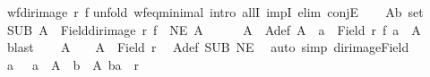 \begin{isabellebody}
\ {\isachardoublequoteopen}wf{\isacharparenleft}{\kern0pt}dir{\isacharunderscore}{\kern0pt}image\ r\ f{\isacharparenright}{\kern0pt}{\isachardoublequoteclose}\isanewline
%
\isadelimproof
%
\endisadelimproof
%
\isatagproof
{}\isamarkupfalse%
{\isacharparenleft}{\kern0pt}unfold\ wf{\isacharunderscore}{\kern0pt}eq{\isacharunderscore}{\kern0pt}minimal{}{\isacharcomma}{\kern0pt}\ intro\ allI\ impI{\isacharcomma}{\kern0pt}\ elim\ conjE{\isacharparenright}{\kern0pt}\isanewline
\ \ \isamarkupfalse%
\ A{\isacharprime}{\kern0pt}{\isacharcolon}{\kern0pt}{\isacharcolon}{\kern0pt}{\isachardoublequoteopen}{\isacharprime}{\kern0pt}b\ set{\isachardoublequoteclose}\isanewline
\ \ \isamarkupfalse%
\ SUB{\isacharcolon}{\kern0pt}\ {\isachardoublequoteopen}A{\isacharprime}{\kern0pt}\ {\isasymle}\ Field{\isacharparenleft}{\kern0pt}dir{\isacharunderscore}{\kern0pt}image\ r\ f{\isacharparenright}{\kern0pt}{\isachardoublequoteclose}\ \ NE{\isacharcolon}{\kern0pt}\ {\isachardoublequoteopen}A{\isacharprime}{\kern0pt}\ {\isasymnoteq}\ {\isacharbraceleft}{\kern0pt}{\isacharbraceright}{\kern0pt}{\isachardoublequoteclose}\isanewline
\ \ \isamarkupfalse%
\ A\ \ A{\isacharunderscore}{\kern0pt}def{\isacharcolon}{\kern0pt}\ {\isachardoublequoteopen}A\ {\isacharequal}{\kern0pt}\ {\isacharbraceleft}{\kern0pt}a\ {\isasymin}\ Field\ r{\isachardot}{\kern0pt}\ f\ a\ {\isasymin}\ A{\isacharprime}{\kern0pt}{\isacharbraceright}{\kern0pt}{\isachardoublequoteclose}\ \isamarkupfalse%
\ blast\isanewline
\ \ \isamarkupfalse%
\ {\isachardoublequoteopen}A\ {\isasymnoteq}\ {\isacharbraceleft}{\kern0pt}{\isacharbraceright}{\kern0pt}\ {\isasymand}\ A\ {\isasymle}\ Field\ r{\isachardoublequoteclose}\ \isamarkupfalse%
\ A{\isacharunderscore}{\kern0pt}def\ SUB\ NE\ \isamarkupfalse%
\ {\isacharparenleft}{\kern0pt}auto\ simp{\isacharcolon}{\kern0pt}\ dir{\isacharunderscore}{\kern0pt}image{\isacharunderscore}{\kern0pt}Field{\isacharparenright}{\kern0pt}\isanewline
\ \ \isamarkupfalse%
\ \isamarkupfalse%
\ a\ \ {}{\isacharcolon}{\kern0pt}\ {\isachardoublequoteopen}a\ {\isasymin}\ A\ {\isasymand}\ {\isacharparenleft}{\kern0pt}{\isasymforall}b\ {\isasymin}\ A{\isachardot}{\kern0pt}\ {\isacharparenleft}{\kern0pt}b{\isacharcomma}{\kern0pt}a{\isacharparenright}{\kern0pt}\ {\isasymnotin}\ r{\isacharparenright}{\kern0pt}{\isachardoublequoteclose}\isanewline
\ \ \isamarkupfalse%

\end{isabellebody}
